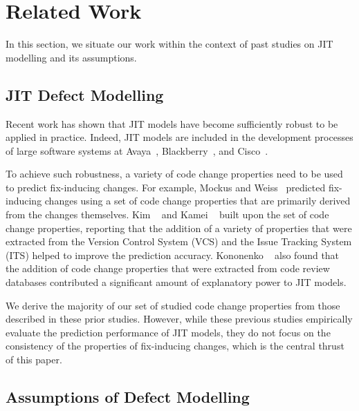 \section{Related Work}
\label{sec:related}

In this section, we situate our work within the context of past studies on JIT modelling and its assumptions.

\subsection{JIT Defect Modelling}

Recent work has shown that JIT models have become sufficiently robust to be applied in practice.
Indeed, JIT models are included in the development processes of large software systems at Avaya~\cite{mockus2000bell}, Blackberry~\cite{shihab2012fse}, and Cisco~\cite{tan2015seip}.

To achieve such robustness, a variety of code change properties need to be used to predict fix-inducing changes.
For example, Mockus and Weiss~\cite{mockus2000bell} predicted fix-inducing changes using a set of code change properties that are primarily derived from the changes themselves.
Kim \ea~\cite{kim2008tse} and Kamei \ea~\cite{kamei2013tse} built upon the set of code change properties, reporting that the addition of a variety of properties that were extracted from the Version Control System (VCS) and the Issue Tracking System (ITS) helped to improve the prediction accuracy.
Kononenko \ea~\cite{kononenko2015icsme} also found that the addition of code change properties that were extracted from code review databases contributed a significant amount of explanatory power to JIT models.

We derive the majority of our set of studied code change properties from those described in these prior studies.
However, while these previous studies empirically evaluate the prediction performance of JIT models, they do not focus on the consistency of the properties of fix-inducing changes, which is the central thrust of this paper.

\subsection{Assumptions of Defect Modelling}
\label{sec:related_bias}



